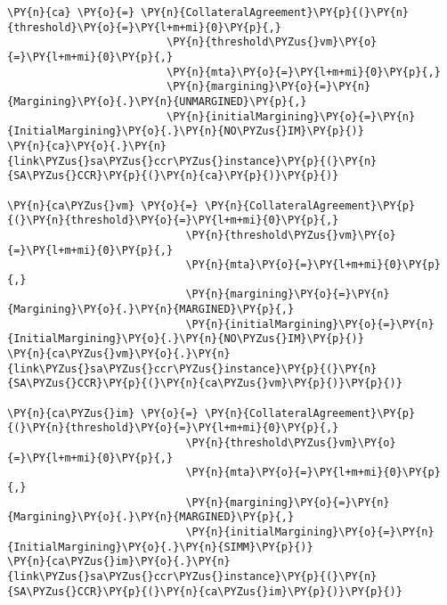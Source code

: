     \begin{tcolorbox}[breakable, size=fbox, boxrule=1pt, pad at break*=1mm,colback=cellbackground, colframe=cellborder]
\begin{Verbatim}[commandchars=\\\{\}]
\PY{n}{ca} \PY{o}{=} \PY{n}{CollateralAgreement}\PY{p}{(}\PY{n}{threshold}\PY{o}{=}\PY{l+m+mi}{0}\PY{p}{,}
                         \PY{n}{threshold\PYZus{}vm}\PY{o}{=}\PY{l+m+mi}{0}\PY{p}{,}
                         \PY{n}{mta}\PY{o}{=}\PY{l+m+mi}{0}\PY{p}{,}
                         \PY{n}{margining}\PY{o}{=}\PY{n}{Margining}\PY{o}{.}\PY{n}{UNMARGINED}\PY{p}{,}
                         \PY{n}{initialMargining}\PY{o}{=}\PY{n}{InitialMargining}\PY{o}{.}\PY{n}{NO\PYZus{}IM}\PY{p}{)}
\PY{n}{ca}\PY{o}{.}\PY{n}{link\PYZus{}sa\PYZus{}ccr\PYZus{}instance}\PY{p}{(}\PY{n}{SA\PYZus{}CCR}\PY{p}{(}\PY{n}{ca}\PY{p}{)}\PY{p}{)}

\PY{n}{ca\PYZus{}vm} \PY{o}{=} \PY{n}{CollateralAgreement}\PY{p}{(}\PY{n}{threshold}\PY{o}{=}\PY{l+m+mi}{0}\PY{p}{,}
                            \PY{n}{threshold\PYZus{}vm}\PY{o}{=}\PY{l+m+mi}{0}\PY{p}{,}
                            \PY{n}{mta}\PY{o}{=}\PY{l+m+mi}{0}\PY{p}{,}
                            \PY{n}{margining}\PY{o}{=}\PY{n}{Margining}\PY{o}{.}\PY{n}{MARGINED}\PY{p}{,}
                            \PY{n}{initialMargining}\PY{o}{=}\PY{n}{InitialMargining}\PY{o}{.}\PY{n}{NO\PYZus{}IM}\PY{p}{)}
\PY{n}{ca\PYZus{}vm}\PY{o}{.}\PY{n}{link\PYZus{}sa\PYZus{}ccr\PYZus{}instance}\PY{p}{(}\PY{n}{SA\PYZus{}CCR}\PY{p}{(}\PY{n}{ca\PYZus{}vm}\PY{p}{)}\PY{p}{)}

\PY{n}{ca\PYZus{}im} \PY{o}{=} \PY{n}{CollateralAgreement}\PY{p}{(}\PY{n}{threshold}\PY{o}{=}\PY{l+m+mi}{0}\PY{p}{,}
                            \PY{n}{threshold\PYZus{}vm}\PY{o}{=}\PY{l+m+mi}{0}\PY{p}{,}
                            \PY{n}{mta}\PY{o}{=}\PY{l+m+mi}{0}\PY{p}{,}
                            \PY{n}{margining}\PY{o}{=}\PY{n}{Margining}\PY{o}{.}\PY{n}{MARGINED}\PY{p}{,}
                            \PY{n}{initialMargining}\PY{o}{=}\PY{n}{InitialMargining}\PY{o}{.}\PY{n}{SIMM}\PY{p}{)}
\PY{n}{ca\PYZus{}im}\PY{o}{.}\PY{n}{link\PYZus{}sa\PYZus{}ccr\PYZus{}instance}\PY{p}{(}\PY{n}{SA\PYZus{}CCR}\PY{p}{(}\PY{n}{ca\PYZus{}im}\PY{p}{)}\PY{p}{)}
\end{Verbatim}
\end{tcolorbox}

